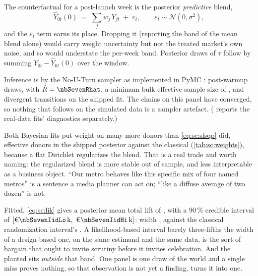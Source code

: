 

The counterfactual for a post-launch week is the posterior \emph{predictive} blend,
%
\begin{equation}
  \widehat{Y}_{0t}(0) \;=\; \sum_j w_j\, Y_{jt} \;+\; \varepsilon_t,
  \qquad \varepsilon_t \sim \mathcal N(0, \sigma^2),
  \label{eq:sc:ppc}
\end{equation}
%
and the $\varepsilon_t$ term earns its place. Dropping it (reporting the band of the mean
blend alone) would carry weight uncertainty but not the treated market's own noise, and so would
understate the per-week band. Posterior draws of $\tau$ follow by summing
$Y_{0t} - \widehat{Y}_{0t}(0)$ over the window.

Inference is by the No-U-Turn sampler \citep{hoffman2014} as implemented in PyMC
\citep{salvatier2016}: \nbSevenNDraws{} post-warmup draws, with $\hat R = \nbSevenRhat$, a
minimum bulk effective sample size of \nbSevenEss{} \citep{vehtari2021}, and \nbSevenDivergences{}
divergent transitions on the shipped fit. The chains on this panel have converged, so nothing
that follows on the simulated data is a sampler artefact. ( reports the
real-data fits' diagnostics separately.)

Both Bayesian fits put weight on many more donors than \cref{eq:sc:slsqp} did,
\nbSevenBayesEffDonors{} effective donors in the shipped posterior against the classical
\nbSevenClEffDonors{} (\cref{tab:sc:weights}), because a flat Dirichlet regularizes the blend.
That is a real trade and worth naming: the regularized blend is more stable out of sample, and
less interpretable as a business object. ``Our metro behaves like this specific mix of four named
metros'' is a sentence a media planner can act on; ``like a diffuse average of two dozen'' is not.



Fitted, \cref{eq:sc:lik} gives a posterior mean total lift of \keur{\nbSevenIidTotal}, with a
90\,\% credible interval of $[\keur{\nbSevenIidLo},\ \keur{\nbSevenIidHi}]$: width
\keur{\nbSevenIidWidth}, against the classical randomization interval's \keur{\nbSevenRiWidth}.
A likelihood-based interval barely three-fifths the width of a design-based one, on the same estimand
and the same data, is the sort of bargain that ought to invite scrutiny before it invites celebration.
And
the planted \keur{\nbSevenTrueTotal} sits \emph{outside} that band. One panel is one draw of the
world and a single miss proves nothing, so that observation is not yet a finding.
 turns it into one.

